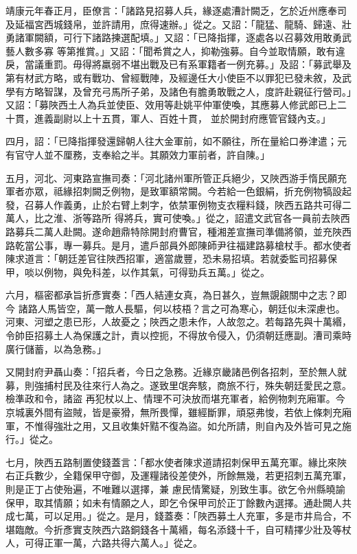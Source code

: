 \begin{pinyinscope}
 靖康元年春正月，臣僚言：「諸路見招募人兵，緣逐處漕計闕乏，乞於近州應奉司及延福宮西城錢帛，並許請用，庶得速辦。」從之。又詔：「龍猛、龍騎、歸遠、壯勇諸軍闕額，可行下諸路揀選配填。」又詔：「已降指揮，逐處各以召募效用敢勇武藝人數多寡
 等第推賞。」又詔：「聞希賞之人，抑勒強募。自今並取情願，敢有違戾，當議重罰。毋得將羸弱不堪出戰及已有系軍籍者一例充募。」及詔：「募武舉及第有材武方略，或有戰功、曾經戰陣，及經邊任大小使臣不以罪犯已發未敘，及武學有方略智謀，及曾充弓馬所子弟，及諸色有膽勇敢戰之人，度許赴親征行營司。」又詔：「募陜西土人為兵並使臣、效用等赴姚平仲軍使喚，其應募人修武郎已上二十貫，進義副尉以上十五貫，軍人、百姓十貫，
 並於開封府應管官錢內支。」



 四月，詔：「已降指揮發還歸朝人往大金軍前，如不願往，所在量給口券津遣；元有官守人並不厘務，支奉給之半。其願效力軍前者，許自陳。」



 五月，河北、河東路宣撫司奏：「河北諸州軍所管正兵絕少，又陜西游手惰民願充軍者亦眾，祗緣招刺闕乏例物，是致軍額常闕。今若給一色銀絹，折充例物犒設起發，召募人作義勇，止於右臂上刺字，依禁軍例物支衣糧料錢，陜西五路共可得二萬人，比之淮、浙等路所
 得將兵，實可使喚。」從之，詔遣文武官各一員前去陜西路募兵二萬人赴闕。遂命趙鼎特除開封府曹官，種湘差宣撫司準備將領，並充陜西路乾當公事，專一募兵。是月，遣戶部員外郎陳師尹往福建路募槍杖手。都水使者陳求道言：「朝廷差官往陜西招軍，適當歲豐，恐未易招填。若就委監司招募保甲，啖以例物，與免科差，以作其氣，可得勁兵五萬。」從之。



 六月，樞密都承旨折彥實奏：「西人結連女真，為日甚久，豈無覬覦關中之志？即今
 諸路人馬皆空，萬一敵人長驅，何以枝梧？言之可為寒心，朝廷似未深慮也。河東、河塑之患已形，人故憂之；陜西之患未作，人故忽之。若每路先與十萬緡，令帥臣招募土人為保護之計，責以控扼，不得放令侵入，仍須朝廷應副。漕司乘時廣行儲蓄，以為急務。」



 又開封府尹聶山奏：「招兵者，今日之急務。近緣京畿諸邑例各招刺，至於無人就募，則強捕村民及往來行人為之。遂致里氓奔駭，商旅不行，殊失朝廷愛民之意。檢準政和令，諸盜
 再犯杖以上、情理不可決放而堪充軍者，給例物刺充廂軍。今京城裏外間有盜賊，皆是豪猾，無所畏憚，雖經斷罪，頑惡弗悛，若依上條刺充廂軍，不惟得強壯之用，又且收集奸黠不復為盜。如允所請，則自內及外皆可見之施行。」從之。



 七月，陜西五路制置使錢蓋言：「都水使者陳求道請招刺保甲五萬充軍。緣比來陜右正兵數少，全籍保甲守御，及運糧諸役差使外，所餘無幾，若更招刺五萬充軍，則是正丁占使殆遍，不唯難以選擇，兼
 慮民情驚疑，別致生事。欲乞令州縣曉諭保甲，取其情願；如未有情願之人，即乞令保甲司於正丁餘數內選擇。通赴闕人共成七萬，可以足用。」從之。是月，錢蓋奏：「陜西募土人充軍，多是市井烏合，不堪臨敵。今折彥實支陜西六路銅錢各十萬緡，每名添錢十千，自可精擇少壯及等杖人，可得正軍一萬，六路共得六萬人。」從之。




\end{pinyinscope}
